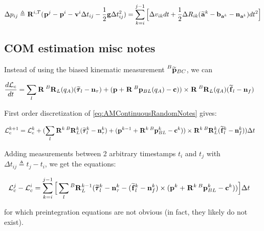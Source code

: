 \documentclass[11pt]{article}
\newcommand{\Rot}[2]{\prescript{#1}{}{\bfR}_{#2}}
\newcommand{\noise}{\bfn}
\newcommand{\bias}{\bfb}
\newcommand{\posi}[2]{\prescript{#1}{}{\bfp}_{#2}}
\newcommand{\posim}[2]{\prescript{#1}{}{\widetilde{\bfp}}_{#2}}
\newcommand{\vel}[2]{\prescript{#1}{}{\bfv}_{#2}}
\newcommand{\acc}[2]{\prescript{#1}{}{\bfa}_{#2}}
\newcommand{\accm}[2]{\prescript{#1}{}{\widetilde{\bfa}}_{#2}}
\newcommand{\forcem}[2]{\prescript{#1}{}{\widetilde{\bff}}_{#2}}
\newcommand{\torquem}[2]{\prescript{#1}{}{\widetilde{\pmb{\tau}}}_{#2}}
\newcommand{\AM}{\mathcal{L}}
\newcommand{\COM}{\bfc}
\newcommand{\grav}{\bfg}
\begin{document}
\begin{equation}
    \Delta p_{ij} \triangleq \Rot{}{}^{i,T}(\posi{}{}^j - \posi{}{}^i - \vel{}{}^i \Delta t_{ij} - \frac{1}{2} \grav \Delta t_{ij}^2) = \sum_{k=i}^{j-1} \Big[\Delta v_{ik}dt +  \frac{1}{2} \Delta R_{ik} (\accm{}{}^k - \bias_{\acc{}{}^k} - \noise_{\acc{}{}^k})dt^2 \Big]
\end{equation}


\subsection{COM estimation misc notes}

Instead of using the biased kinematic measurement $\posim{B}{BC}$, we can 

\begin{equation}
\begin{split}
\frac{d\AM_c}{dt}&= \sum_l \Rot{}{}\Rot{B}{L}(q_A)(\torquem{}{l} - \noise_{\tau}) + (\bfp +
\Rot{}{}\posi{B}{BL}(q_A) - \COM)) \times \Rot{}{}\Rot{B}{L}(q_A)(\forcem{}{l} - \noise_f)
\end{split}
\label{eq:AMContinuousRandomNotes}
\end{equation}

First order discretization of \ref{eq:AMContinuousRandomNotes} gives:

\begin{equation}
\begin{split}
\AM_c^{k+1} &= \AM_c^{k} +  ( 
\sum_l \Rot{}{}^{k}\Rot{B}{L}^{k}(\torquem{}{l}^{k} - \noise_{\tau}^{k}) + (\bfp^{k-1} +
\Rot{}{}^{k}\posi{B}{BL}^{k} - \COM^{k})) \times \Rot{}{}^{k}\Rot{B}{L}^{k}(\forcem{}{l}^{k} - \noise_f^{k}) 
) \Delta t
\end{split}
\end{equation}



Adding measurements between 2 arbitrary timestamps \(t_i\) and \(t_j\) with \(\Delta t_{ij} \triangleq t_j - t_i\), we get the equations:

\begin{equation}
\begin{split}
\AM_c^{j} - \AM_c^{i} &=  \sum_{k=i}^{j-1} \Big[ 
\sum_l \Rot{B}{L}^{k-1} (\torquem{}{l}^{k} - \noise_{\tau}^{k} - (\forcem{}{l}^{k} - \noise_f^{k}) \times (\bfp^{k} + \Rot{}{}^{k}\posi{B}{BL}^{k} - \COM^{k})) \Big]  \Delta t
\end{split}
\end{equation}


for which preintegration equations are not obvious (in fact, they likely do not exist).
\end{document}
